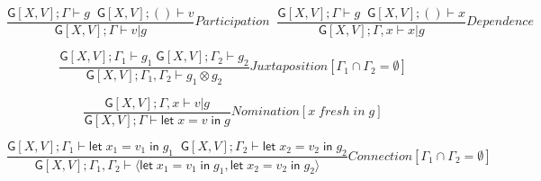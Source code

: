 \[\frac{ \mathsf{G}[X,V]; \Gamma \vdash g \;\; \mathsf{G}[X,V]; () \vdash v }{ \mathsf{G}[X,V]; \Gamma \vdash v | g}Participation \; \; \frac{ \mathsf{G}[X,V]; \Gamma \vdash g \;\; \mathsf{G}[X,V]; () \vdash x }{ \mathsf{G}[X,V]; \Gamma, x \vdash x | g}Dependence\]

\[\frac{ \mathsf{G}[X,V]; \Gamma_1 \vdash g_1 \; \mathsf{G}[X,V]; \Gamma_2 \vdash g_2}{ \mathsf{G}[X,V]; \Gamma_1, \Gamma_2 \vdash g_1 \otimes g_2}Juxtaposition[\Gamma_1 \cap \Gamma_2 = \emptyset]\]

\[\frac{ \mathsf{G}[X,V]; \Gamma,x \vdash v|g}{ \mathsf{G}[X,V]; \Gamma \vdash \mathsf{let}\; x = v \; \mathsf{in}\; g}Nomination[x \;fresh\; in\; g]\]

\[\frac{ \mathsf{G}[X,V]; \Gamma_1 \vdash \mathsf{let}\; x_1 = v_1 \; \mathsf{in}\; g_1 \; \;\mathsf{G}[X,V]; \Gamma_2 \vdash \mathsf{let}\; x_2 = v_2 \; \mathsf{in}\; g_2}{ \mathsf{G}[X,V]; \Gamma_1,\Gamma_2 \vdash \langle \mathsf{let}\; x_1 = v_1 \; \mathsf{in}\; g_1, \mathsf{let}\; x_2 = v_2 \; \mathsf{in}\; g_2 \rangle}Connection[\Gamma_1 \cap \Gamma_2 = \emptyset]\]
